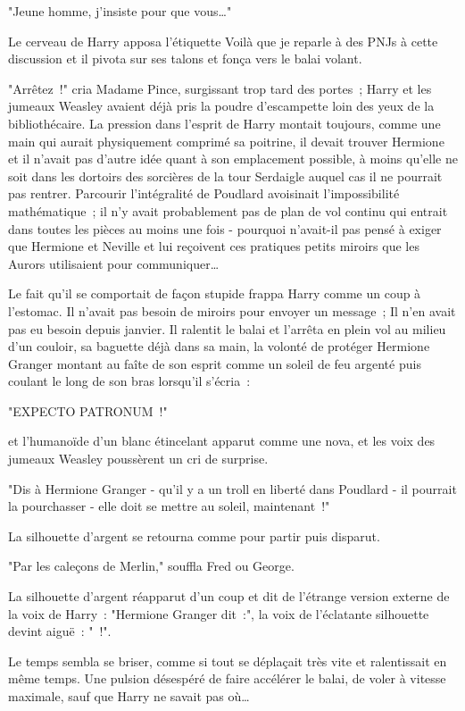 "Jeune homme, j'insiste pour que vous…"

Le cerveau de Harry apposa l'étiquette Voilà que je reparle à des PNJs à cette discussion et il pivota sur ses talons et fonça vers le balai volant.

"Arrêtez~!" cria Madame Pince, surgissant trop tard des portes~; Harry et les jumeaux Weasley avaient déjà pris la poudre d'escampette loin des yeux de la bibliothécaire. La pression dans l'esprit de Harry montait toujours, comme une main qui aurait physiquement comprimé sa poitrine, il devait trouver Hermione et il n'avait pas d'autre idée quant à son emplacement possible, à moins qu'elle ne soit dans les dortoirs des sorcières de la tour Serdaigle auquel cas il ne pourrait pas rentrer. Parcourir l'intégralité de Poudlard avoisinait l'impossibilité mathématique~; il n'y avait probablement pas de plan de vol continu qui entrait dans toutes les pièces au moins une fois - pourquoi n'avait-il pas pensé à exiger que Hermione et Neville et lui reçoivent ces pratiques petits miroirs que les Aurors utilisaient pour communiquer…

Le fait qu'il se comportait de façon stupide frappa Harry comme un coup à l'estomac. Il n'avait pas besoin de miroirs pour envoyer un message~; Il n'en avait pas eu besoin depuis janvier. Il ralentit le balai et l'arrêta en plein vol au milieu d'un couloir, sa baguette déjà dans sa main, la volonté de protéger Hermione Granger montant au faîte de son esprit comme un soleil de feu argenté puis coulant le long de son bras lorsqu'il s'écria~:

"EXPECTO PATRONUM~!"

et l'humanoïde d'un blanc étincelant apparut comme une nova, et les voix des jumeaux Weasley poussèrent un cri de surprise.

"Dis à Hermione Granger - qu'il y a un troll en liberté dans Poudlard - il pourrait la pourchasser - elle doit se mettre au soleil, maintenant~!"

La silhouette d'argent se retourna comme pour partir puis disparut.

"Par les caleçons de Merlin," souffla Fred ou George.

La silhouette d'argent réapparut d'un coup et dit de l'étrange version externe de la voix de Harry~: "Hermione Granger dit~:", la voix de l'éclatante silhouette devint aiguë~: "~!".

Le temps sembla se briser, comme si tout se déplaçait très vite et ralentissait en même temps. Une pulsion désespéré de faire accélérer le balai, de voler à vitesse maximale, sauf que Harry ne savait pas où…

